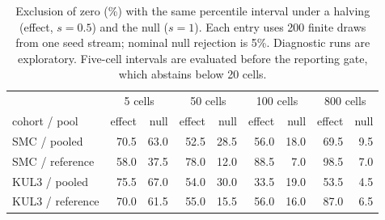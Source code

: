 \begin{table}[htbp]
\centering\small
\caption{Exclusion of zero (\%) with the same percentile interval under a halving
(effect, $s=0.5$) and the null ($s=1$). Each entry uses 200 finite draws from
one seed stream; nominal null rejection is 5\%. Diagnostic runs are exploratory.
Five-cell intervals are evaluated before the reporting gate, which abstains
below 20 cells.}
\label{tab:lowcounts}
\begin{tabular}{@{}lrrrrrrrr@{}}
\toprule
& \multicolumn{2}{c}{5 cells} & \multicolumn{2}{c}{50 cells} & \multicolumn{2}{c}{100 cells} & \multicolumn{2}{c}{800 cells} \\
cohort / pool & effect & null & effect & null & effect & null & effect & null \\
\midrule
SMC / pooled & 70.5 & 63.0 & 52.5 & 28.5 & 56.0 & 18.0 & 69.5 & 9.5 \\
SMC / reference & 58.0 & 37.5 & 78.0 & 12.0 & 88.5 & 7.0 & 98.5 & 7.0 \\
KUL3 / pooled & 75.5 & 67.0 & 54.0 & 30.0 & 33.5 & 19.0 & 53.5 & 4.5 \\
KUL3 / reference & 70.0 & 61.5 & 55.0 & 15.5 & 56.0 & 16.0 & 87.0 & 6.5 \\
\bottomrule
\end{tabular}
\end{table}
